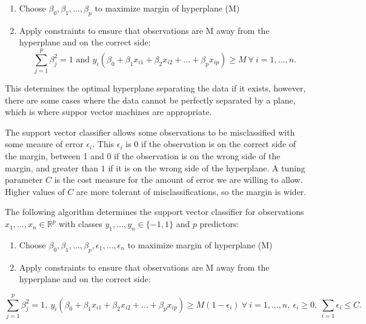 \documentclass[12pt,twoside]{reedthesis}
\begin{document}
\begin{enumerate}
\def\labelenumi{(\arabic{enumi})}
\item
  Choose \(\beta_0, \beta_1, ..., \beta_p\) to maximize margin of hyperplane (M)
\item
  Apply constraints to ensure that observations are M away from the hyperplane and on the correct side:
  \[\sum_{j = 1}^p \beta_j^2 = 1 \text{ and } y_i(\beta_0 + \beta_1 x_{i1} + \beta_2 x_{i2} + ... + \beta_p x_{ip}) \geq M \  \forall \ i = 1, ..., n.\]
\end{enumerate}
This determines the optimal hyperplane separating the data if it exists, however, there are some cases where the data cannot be perfectly separated by a plane, which is where suppor vector machines are appropriate.

The support vector classifier allows some observations to be misclassified with some meaure of error \(\epsilon_i\). This \(\epsilon_i\) is 0 if the observation is on the correct side of the margin, between 1 and 0 if the observation is on the wrong side of the margin, and greater than \(1\) if it is on the wrong side of the hyperplane. A tuning parameter \(C\) is the cost measure for the amount of error we are willing to allow. Higher values of \(C\) are more tolerant of misclassifications, so the margin is wider.

The following algorithm determines the support vector classifier for observations \(x_1, ..., x_n \in \mathbb{R}^p\) with classes \(y_1, ..., y_n \in \{-1, 1\}\) and \(p\) predictors:
\begin{enumerate}
\def\labelenumi{(\arabic{enumi})}
\item
  Choose \(\beta_0, \beta_1, ..., \beta_p, \epsilon_1, ..., \epsilon_n\) to maximize margin of hyperplane (M)
\item
  Apply constraints to ensure that observations are M away from the hyperplane and on the correct side:
\end{enumerate}
\[\sum_{j = 1}^p \beta_j^2 = 1, \  y_i(\beta_0 + \beta_1 x_{i1} + \beta_2 x_{i2} + ... + \beta_p x_{ip}) \geq M(1 - \epsilon_i) \  \forall \ i = 1, ..., n, \ \epsilon_i \geq 0, \ \sum_{i = 1}\epsilon_i \leq C.\]
\end{document}
